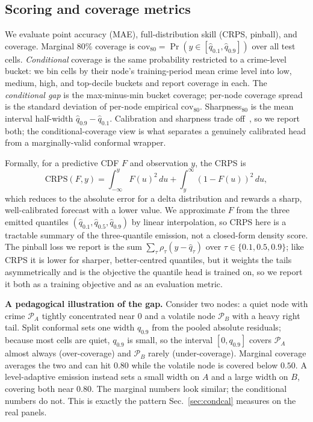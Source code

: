 \documentclass[11pt,conference]{IEEEtran}
\begin{document}
\subsection{Scoring and coverage metrics}\label{sec:metrics}
We evaluate point accuracy (MAE), full-distribution skill (CRPS, pinball), and
coverage. Marginal 80\% coverage is
$\mathrm{cov}_{80}=\Pr(y\in[\hat q_{0.1},\hat q_{0.9}])$ over all test cells.
\emph{Conditional} coverage is the same probability restricted to a crime-level
bucket: we bin cells by their node's training-period mean crime level into low,
medium, high, and top-decile buckets and report coverage in each. The
\emph{conditional gap} is the max-minus-min bucket coverage; per-node coverage
spread is the standard deviation of per-node empirical $\mathrm{cov}_{80}$.
Sharpness$_{80}$ is the mean interval half-width $\hat q_{0.9}-\hat q_{0.1}$.
Calibration and sharpness trade off~\cite{gneiting2007calibration}, so we report
both; the conditional-coverage view is what separates a genuinely calibrated head
from a marginally-valid conformal wrapper.

Formally, for a predictive CDF $F$ and observation $y$, the CRPS is
\begin{equation}\label{eq:crps}
  \mathrm{CRPS}(F,y)=\int_{-\infty}^{y}\!F(u)^2\,du+\int_{y}^{\infty}\!(1-F(u))^2\,du,
\end{equation}
which reduces to the absolute error for a delta distribution and rewards a
sharp, well-calibrated forecast with a lower value. We approximate $F$ from the
three emitted quantiles $(\hat q_{0.1},\hat q_{0.5},\hat q_{0.9})$ by linear
interpolation, so CRPS here is a tractable summary of the three-quantile
emission, not a closed-form density score. The pinball loss we report is the sum
$\sum_\tau\rho_\tau(y-\hat q_\tau)$ over $\tau\in\{0.1,0.5,0.9\}$; like CRPS it
is lower for sharper, better-centred quantiles, but it weights the tails
asymmetrically and is the objective the quantile head is trained on, so we report
it both as a training objective and as an evaluation metric.

\textbf{A pedagogical illustration of the gap.} Consider two nodes: a quiet node
with crime $\mathcal{P}_A$ tightly concentrated near $0$ and a volatile node
$\mathcal{P}_B$ with a heavy right tail. Split conformal sets one width
$q_{0.9}$ from the pooled absolute residuals; because most cells are quiet,
$q_{0.9}$ is small, so the interval $[0,q_{0.9}]$ covers $\mathcal{P}_A$ almost
always (over-coverage) and $\mathcal{P}_B$ rarely (under-coverage). Marginal
coverage averages the two and can hit $0.80$ while the volatile node is covered
below $0.50$. A level-adaptive emission instead sets a small width on $A$ and a
large width on $B$, covering both near $0.80$. The marginal numbers look similar;
the conditional numbers do not. This is exactly the pattern
Sec.~\ref{sec:condcal} measures on the real panels.
\end{document}
